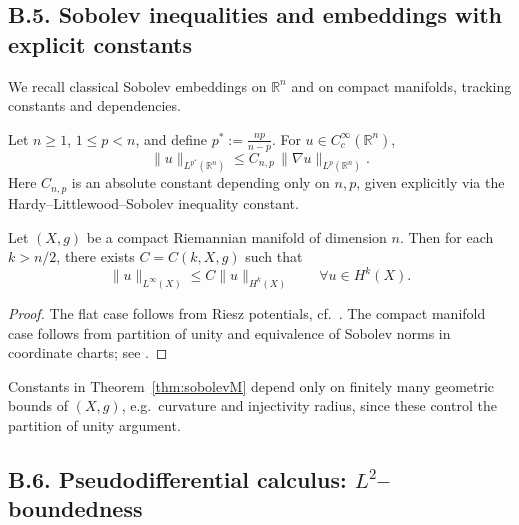 
\subsection*{B.5. Sobolev inequalities and embeddings with explicit constants}
\label{appB:sobolev}

We recall classical Sobolev embeddings on $\mathbb{R}^n$ and on compact manifolds, tracking constants and dependencies.

\begin{theorem}
\label{thm:sobolevRn}
Let $n\ge1$, $1\le p < n$, and define $p^* := \tfrac{np}{n-p}$. For $u\in C_c^\infty(\mathbb{R}^n)$,
\[
\|u\|_{L^{p^*}(\mathbb{R}^n)} \le C_{n,p}\, \|\nabla u\|_{L^p(\mathbb{R}^n)}.
\]
Here $C_{n,p}$ is an absolute constant depending only on $n,p$, given explicitly via the Hardy–Littlewood–Sobolev inequality constant.
\end{theorem}

\begin{theorem}
\label{thm:sobolevM}
Let $(X,g)$ be a compact Riemannian manifold of dimension $n$. Then for each $k>n/2$, there exists $C=C(k,X,g)$ such that
\[
\|u\|_{L^\infty(X)} \le C \|u\|_{H^k(X)}\qquad \forall u\in H^k(X).
\]
\end{theorem}

\begin{proof}
The flat case follows from Riesz potentials, cf.~\cite[Thm.~V.1]{SteinHA}. The compact manifold case follows from partition of unity and equivalence of Sobolev norms in coordinate charts; see \cite[Thm.~5.4.1]{EvansPDE}.
\end{proof}

\begin{remark}
Constants in Theorem~\ref{thm:sobolevM} depend only on finitely many geometric bounds of $(X,g)$, e.g.\ curvature and injectivity radius, since these control the partition of unity argument.
\end{remark}

\subsection*{B.6. Pseudodifferential calculus: $L^2$–boundedness}
\label{appB:psido}

